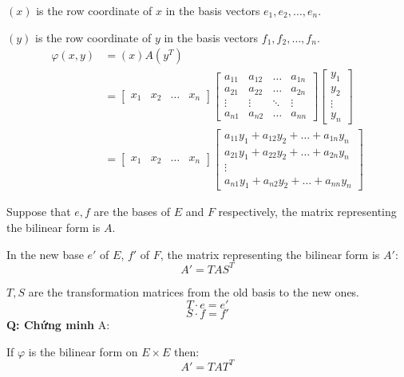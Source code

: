 $(x)$ is the row coordinate of $x$ in the basis vectors $e_1, e_2, \ldots, e_n$.

$(y)$ is the row coordinate of $y$ in the basis vectors $f_1, f_2, \ldots, f_n$.
\begin{align*}
    \varphi(x, y) &= (x) A (y^T)\\
    &= \begin{bmatrix}
        x_1 & x_2 & \ldots & x_n
    \end{bmatrix}
    \begin{bmatrix}
        a_{11} & a_{12} & \ldots & a_{1n}\\
        a_{21} & a_{22} & \ldots & a_{2n}\\
        \vdots & \vdots & \ddots & \vdots\\
        a_{n1} & a_{n2} & \ldots & a_{nn}
    \end{bmatrix}
    \begin{bmatrix}
        y_1\\
        y_2\\
        \vdots\\
        y_n
    \end{bmatrix}\\
    &= \begin{bmatrix}
        x_1 & x_2 & \ldots & x_n
    \end{bmatrix}
    \begin{bmatrix}
        a_{11}y_1 + a_{12}y_2 + \ldots + a_{1n}y_n\\
        a_{21}y_1 + a_{22}y_2 + \ldots + a_{2n}y_n\\
        \vdots \\
        a_{n1}y_1 + a_{n2}y_2 + \ldots + a_{nn}y_n
    \end{bmatrix}
\end{align*}

Suppose that $e, f$ are the bases of $E$ and $F$ respectively, the matrix representing the bilinear form is $A$.

In the new base $e'$ of $E$, $f'$ of $F$, the matrix representing the bilinear form is $A'$:
\begin{equation*}
    A' = T A S^T
\end{equation*}


$T, S$ are the transformation matrices from the old basis to the new ones.
\[
T \cdot e = e'
\]
\[
S \cdot f = f'
\]
\textbf{Q: Chứng minh}
A: 

If $\varphi$ is the bilinear form on $E \times E$ then:
\[
A' = T A T^T
\]

